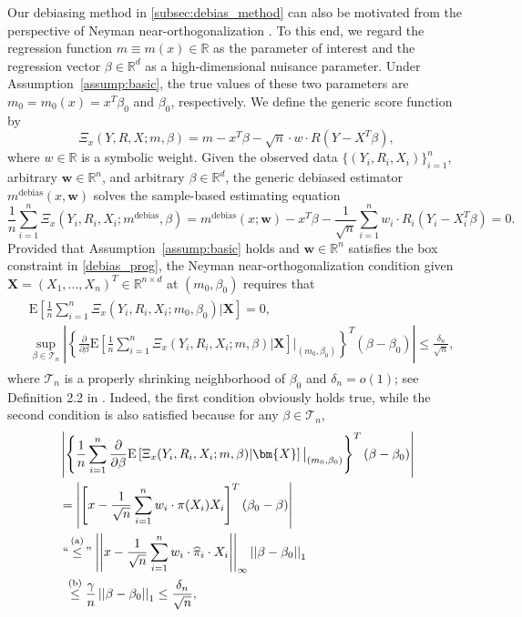 \documentclass[ejsv2,noshowframe]{imsart}
\theoremstyle{plain}
\theoremstyle{definition}
\theoremstyle{remark}
\newcommand{\norm}[1]{\left|\left| #1 \right|\right|}
\renewcommand{\hat}{\widehat}
\begin{document}
Our debiasing method in \autoref{subsec:debias_method} can also be motivated from the perspective of Neyman near-orthogonalization \citep{neyman1959optimal,neyman1979c,chernozhukov2018double}. To this end, we regard the regression function $m\equiv m(x) \in \mathbb{R}$ as the parameter of interest and the regression vector $\beta \in \mathbb{R}^d$ as a high-dimensional nuisance parameter. Under Assumption~\ref{assump:basic}, the true values of these two parameters are $m_0=m_0(x)=x^T\beta_0$ and $\beta_0$, respectively. We define the generic score function by
$$\Xi_x(Y,R,X; m,\beta) = m-x^T\beta - \sqrt{n} \cdot w \cdot R(Y-X^T\beta),$$ 
where $w \in \mathbb{R}$ is a symbolic weight. Given the observed data $\{(Y_i,R_i,X_i)\}_{i=1}^n$, arbitrary $\bm{w} \in \mathbb{R}^n$, and arbitrary $\beta \in \mathbb{R}^d$, the generic debiased estimator $m^{\text{debias}}(x, \bm{w})$ solves the sample-based estimating equation
\begin{equation}
	\label{neyman_score_func}
	\frac{1}{n}\sum_{i=1}^n \Xi_x(Y_i,R_i,X_i; m^{\text{debias}},\beta) =m^{\text{debias}}(x; \bm{w}) -x^T\beta - \frac{1}{\sqrt{n}}\sum_{i=1}^n w_i \cdot R_i\left(Y_i-X_i^T\beta\right) =0.
\end{equation}
Provided that Assumption~\ref{assump:basic} holds and $\bm{w} \in \mathbb{R}^n$ satisfies the box constraint in \eqref{debias_prog}, the Neyman near-orthogonalization condition given $\bm{X}=(X_1,...,X_n)^T \in \mathbb{R}^{n\times d}$ at $(m_0,\beta_0)$ requires that
\begin{align}
	\label{neyman_near_ortho}
	\begin{split}
		&\mathrm{E}\left[\frac{1}{n}\sum_{i=1}^n \Xi_x(Y_i,R_i,X_i; m_0,\beta_0) \bigg| \bm{X}\right] = 0,\\
		& \sup_{\beta \in \mathcal{T}_n} \left|\left\{\frac{\partial}{\partial \beta} \mathrm{E}\left[\frac{1}{n}\sum_{i=1}^n \Xi_x(Y_i,R_i,X_i; m,\beta) \Big| \bm{X}\right] \bigg|_{(m_0,\beta_0)} \right\}^T (\beta-\beta_0)\right| \leq \frac{\delta_n}{\sqrt{n}},  
	\end{split}
\end{align}
where $\mathcal{T}_n$ is a properly shrinking neighborhood of $\beta_0$ and $\delta_n=o(1)$; see Definition 2.2 in \cite{chernozhukov2018double}. Indeed, the first condition obviously holds true, while the second condition is also satisfied because for any $\beta \in \mathcal{T}_n$,
\begin{align*}
	&\left|\left\{\frac{1}{n}\sum_{i=1}^n \frac{\partial}{\partial \beta} \mathrm{E}\left[\Xi_x(Y_i,R_i,X_i; m,\beta) | \bm{X}\right]\big|_{(m_0,\beta_0)} \right\}^T (\beta-\beta_0)\right| \\
	&= \left|\left[x-\frac{1}{\sqrt{n}} \sum_{i=1}^n w_i \cdot \pi(X_i) X_i\right]^T (\beta_0 - \beta) \right| \\
	&\stackrel{\text{(a)}}{``\leq"} \norm{x-\frac{1}{\sqrt{n}} \sum_{i=1}^n w_i \cdot \hat{\pi}_i\cdot X_i}_{\infty} \norm{\beta-\beta_0}_1\\
	&\: \: \stackrel{\text{(b)}}{\leq} \frac{\gamma}{n} \norm{\beta-\beta_0}_1 \leq \frac{\delta_n}{\sqrt{n}},
\end{align*}
\end{document}
